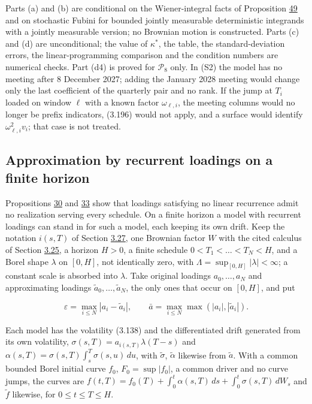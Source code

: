 \documentclass[11pt]{article}
\begin{document}
Parts (a) and (b) are conditional on the Wiener-integral facts of Proposition \hyperref[res:Proposition-49]{49} and on stochastic Fubini for bounded jointly measurable deterministic integrands with a jointly measurable version; no Brownian motion is constructed. Parts (c) and (d) are unconditional; the value of \(\kappa^*\), the table, the standard-deviation errors, the linear-programming comparison and the condition numbers are numerical checks. Part (d4) is proved for \(\mathcal P_8\) only. In (S2) the model has no meeting after 8 December 2027; adding the January 2028 meeting would change only the last coefficient of the quarterly pair and no rank. If the jump at \(T_i\) loaded on window \(\ell\) with a known factor \(\omega_{\ell,i}\), the meeting columns would no longer be prefix indicators, (3.196) would not apply, and a surface would identify \(\omega_{\ell,i}^2v_i\); that case is not treated.

\subsection{Approximation by recurrent loadings on a finite horizon}\label{sec:3.45}

Propositions \hyperref[res:Proposition-30]{30} and \hyperref[res:Proposition-33]{33} show that loadings satisfying no linear recurrence admit no realization serving every schedule. On a finite horizon a model with recurrent loadings can stand in for such a model, each keeping its own drift. Keep the notation \(i(s,T)\) of Section \hyperref[sec:3.27]{3.27}, one Brownian factor \(W\) with the cited calculus of Section \hyperref[sec:3.25]{3.25}, a horizon \(H>0\), a finite schedule \(0<T_1<\dots<T_N<H\), and a Borel shape \(\lambda\) on \([0,H]\), not identically zero, with \(\Lambda=\sup_{[0,H]}|\lambda|<\infty\); a constant scale is absorbed into \(\lambda\). Take original loadings \(a_0,\dots,a_N\) and approximating loadings \(\tilde a_0,\dots,\tilde a_N\), the only ones that occur on \([0,H]\), and put

\begin{equation*}
\varepsilon=\max_{i\le N}|a_i-\tilde a_i|,\qquad\bar a=\max_{i\le N}\max(|a_i|,|\tilde a_i|). \tag{3.199}\label{eq:3.199}
\end{equation*}

Each model has the volatility (3.138) and the differentiated drift generated from its own volatility, \(\sigma(s,T)=a_{i(s,T)}\lambda(T-s)\) and \(\alpha(s,T)=\sigma(s,T)\int_s^T\sigma(s,u)\,du\), with \(\tilde\sigma\), \(\tilde\alpha\) likewise from \(\tilde a\). With a common bounded Borel initial curve \(f_0\), \(F_0=\sup|f_0|\), a common driver and no curve jumps, the curves are \(f(t,T)=f_0(T)+\int_0^t\alpha(s,T)\,ds+\int_0^t\sigma(s,T)\,dW_s\) and \(\tilde f\) likewise, for \(0\le t\le T\le H\).
\end{document}
